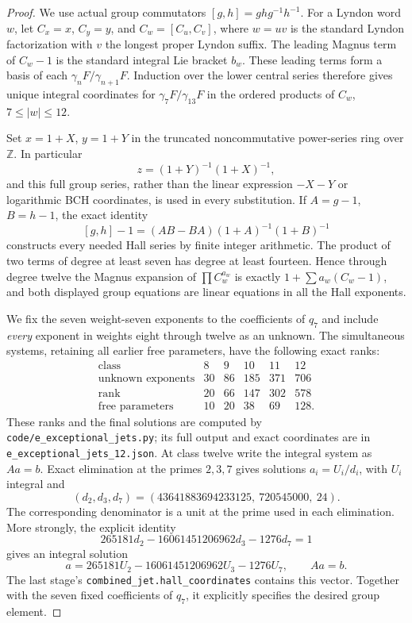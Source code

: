 \begin{proof}
We use actual group commutators $[g,h]=ghg^{-1}h^{-1}$.
For a Lyndon word $w$, let $C_x=x$, $C_y=y$, and
$C_w=[C_u,C_v]$, where $w=uv$ is the standard Lyndon
factorization with $v$ the longest proper Lyndon suffix.
The leading Magnus term of $C_w-1$ is the standard integral
Lie bracket $b_w$. These leading terms form a basis of each
$\gamma_nF/\gamma_{n+1}F$. Induction over the lower central
series therefore gives unique integral coordinates for
$\gamma_7F/\gamma_{13}F$ in the ordered products of
$C_w$, $7\leq |w|\leq12$.

Set $x=1+X$, $y=1+Y$ in the truncated noncommutative
power-series ring over $\mathbb Z$. In particular
\[
 z=(1+Y)^{-1}(1+X)^{-1},
\]
and this full group series, rather than the linear expression
$-X-Y$ or logarithmic BCH coordinates, is used in every
substitution. If $A=g-1$, $B=h-1$, the exact identity
\[
 [g,h]-1=(AB-BA)(1+A)^{-1}(1+B)^{-1}
\]
constructs every needed Hall series by finite integer arithmetic.
The product of two terms of degree at least seven has degree at
least fourteen. Hence through degree twelve the Magnus expansion
of $\prod C_w^{a_w}$ is exactly
$1+\sum a_w(C_w-1)$, and both displayed group equations
are linear equations in all the Hall exponents.

We fix the seven weight-seven exponents to the coefficients of
$q_7$ and include \emph{every} exponent in weights eight through
twelve as an unknown. The simultaneous systems, retaining all
earlier free parameters, have the following exact ranks:
\[
\begin{array}{c|rrrrr}
\text{class}&8&9&10&11&12\\\hline
\text{unknown exponents}&30&86&185&371&706\\
\text{rank}&20&66&147&302&578\\
\text{free parameters}&10&20&38&69&128.
\end{array}
\]
These ranks and the final solutions are computed by
\texttt{code/e\_exceptional\_jets.py}; its full output and exact
coordinates are in \texttt{e\_exceptional\_jets\_12.json}.
At class twelve write the integral system as $Aa=b$.
Exact elimination at the primes $2,3,7$ gives solutions
$a_i=U_i/d_i$, with $U_i$ integral and
\[
 (d_2,d_3,d_7)
 =(43641883694233125,\ 720545000,\ 24).
\]
The corresponding denominator is a unit at the prime used in
each elimination. More strongly, the explicit identity
\[
 265181d_2-16061451206962d_3-1276d_7=1
\]
gives an integral solution
\[
 a=265181U_2-16061451206962U_3-1276U_7,
 \qquad Aa=b.
\]
The last stage's \texttt{combined\_jet.hall\_coordinates}
contains this vector. Together with the seven fixed coefficients
of $q_7$, it explicitly specifies the desired group element.


\end{proof}
